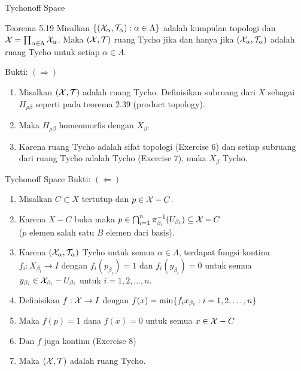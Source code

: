 \begin{frame}{Tychonoff Space}
    \begin{block}{Teorema 5.19}
        Misalkan $\set*{(\mcX_\alpha,\mcT_\alpha):\alpha\in\Lambda}$ adalah kumpulan topologi dan $\mcX=\prod_{\alpha\in\Lambda}\mcX_\alpha$. 
        Maka $(\mcX,\mcT)$ ruang Tycho jika dan hanya jika $(\mcX_\alpha,\mcT_\alpha)$ adalah ruang Tycho untuk setiap $\alpha\in\Lambda$.
    \end{block}
    Bukti: $(\Rightarrow)$
    \begin{enumerate}
        \item Misalkan $(\mcX,\mcT)$ adalah ruang Tycho. Definisikan subruang dari $X$
        sebagai $H_{\rho\beta}$ seperti pada teorema 2.39 (product topology).
        \item Maka $H_{\rho\beta}$ homeomorfis dengan $X_\beta$.
        \item Karena ruang Tycho adalah sifat topologi (Exercise 6) dan setiap 
        subruang dari ruang Tycho adalah Tycho (Exercise 7), maka $X_\beta$ Tycho.
    \end{enumerate}
\end{frame}

\begin{frame}{Tychonoff Space}
    Bukti: $(\Leftarrow)$
    \begin{enumerate}
        \item Misalkan $C\subset X$ tertutup dan $p\in \mcX-C$. 
        \item Karena $X-C$ buka maka $p \in \bigcap_{i=1}^n \pi_{\beta_i}^{-1}(U_{\beta_i}) \subseteq \mcX-C$
        \\($p$ elemen salah satu $B$ elemen dari basis).
        \item Karena $(\mcX_\alpha,\mcT_\alpha)$ Tycho untuk semua $\alpha\in\Lambda$, terdapat fungsi kontinu
        $f_i:X_{\beta_i} \to I$ dengan $f_i(p_{\beta_i})=1$ dan $f_i(y_{\beta_i})=0$ untuk semua $y_{\beta_i}\in \mcX_{\beta_i}-U_{\beta_i}$
        untuk $i=1,2,\dots,n$.
        \item Definisikan $f:\mcX\to I$ dengan $f(x)=\min\set{f_i{x_{\beta_i}}: i=1,2,\dots,n}$
        \item Maka $f(p)=1$ dana $f(x)=0$ untuk semua $x\in \mcX-C$
        \item Dan $f$ juga kontinu (Exercise 8)
        \item Maka $(\mcX,\mcT)$ adalah ruang Tycho.
    \end{enumerate}
\end{frame}

